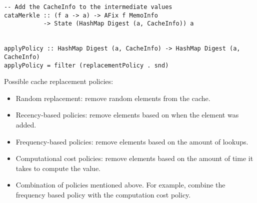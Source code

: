 \begin{verbatim}
-- Add the CacheInfo to the intermediate values
cataMerkle :: (f a -> a) -> AFix f MemoInfo 
           -> State (HashMap Digest (a, CacheInfo)) a


applyPolicy :: HashMap Digest (a, CacheInfo) -> HashMap Digest (a, CacheInfo)
applyPolicy = filter (replacementPolicy . snd)
\end{verbatim}

Possible cache replacement policies:
\begin{itemize}
  \item Random replacement: remove random elements from the cache.
  \item Recency-based policies: remove elements based on when the element was added.
  \item Frequency-based policies: remove elements based on the amount of lookups.
  \item Computational cost policies: remove elements based on the amount of time it takes to compute the value.
  \item Combination of policies mentioned above. For example, combine the frequency based policy with the computation cost policy.
\end{itemize}